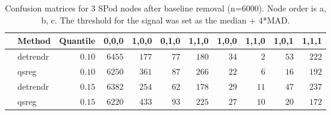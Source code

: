 \begin{table}[!tbp]
\caption{Confusion matrices for 3 SPod nodes after baseline 
      removal (n=6000). Node order is a, b, c. The threshold for the signal was 
      set as the median + 4*MAD.\label{confusion}} 
\begin{center}
\begin{tabular}{llrrrrrrrrr}
\hline\hline
\multicolumn{1}{l}{}&\multicolumn{1}{c}{Method}&\multicolumn{1}{c}{Quantile}&\multicolumn{1}{c}{0,0,0}&\multicolumn{1}{c}{1,0,0}&\multicolumn{1}{c}{0,1,0}&\multicolumn{1}{c}{1,1,0}&\multicolumn{1}{c}{1,0,0}&\multicolumn{1}{c}{1,1,0}&\multicolumn{1}{c}{1,0,1}&\multicolumn{1}{c}{1,1,1}\tabularnewline
\hline
&detrendr&$0.10$&$6455$&$177$&$77$&$180$&$34$&$ 2$&$53$&$222$\tabularnewline
&qsreg&$0.10$&$6250$&$361$&$87$&$266$&$22$&$ 6$&$16$&$192$\tabularnewline
&detrendr&$0.15$&$6382$&$254$&$62$&$178$&$29$&$11$&$47$&$237$\tabularnewline
&qsreg&$0.15$&$6220$&$433$&$93$&$225$&$27$&$10$&$20$&$172$\tabularnewline
\hline
\end{tabular}\end{center}
\end{table}
